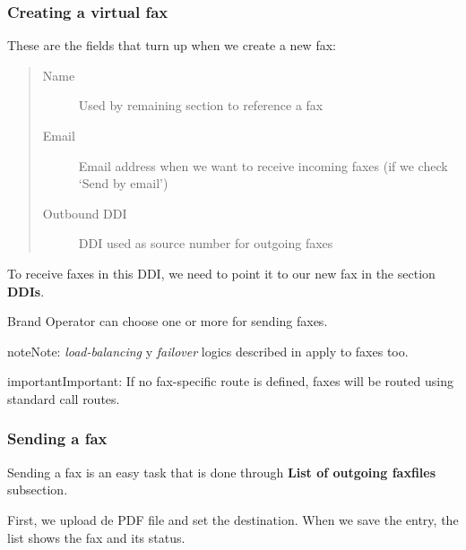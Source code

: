 \documentclass[letterpaper,10pt,english]{sphinxmanual}
\begin{document}
\subsubsection{Creating a virtual fax}
\label{administration_portal/client/vpbx/faxes:creating-a-virtual-fax}
These are the fields that turn up when we create a new fax:
\begin{quote}
\begin{description}
\item[{Name}] \leavevmode
Used by remaining section to reference a fax

\item[{Email}] \leavevmode
Email address when we want to receive incoming faxes (if we check `Send
by email')

\item[{Outbound DDI}] \leavevmode
DDI used as source number for outgoing faxes

\end{description}
\end{quote}

To receive faxes in this DDI, we need to point it to our new fax in the section
\textbf{DDIs}.

Brand Operator can choose one or more {\hyperref[administration_portal/brand/routing/outgoing_routings:outgoing\string-routings]{}} for sending faxes.

\begin{notice}{note}{Note:}
\emph{load-balancing} y \emph{failover} logics described in {\hyperref[administration_portal/brand/routing/outgoing_routings:outgoing\string-routings]{}}
apply to faxes too.
\end{notice}

\begin{notice}{important}{Important:}
If no fax-specific route is defined, faxes will be routed using
standard call routes.
\end{notice}


\subsubsection{Sending a fax}
\label{administration_portal/client/vpbx/faxes:sending-a-fax}
Sending a fax is an easy task that is done through \textbf{List of outgoing faxfiles} subsection.

First, we upload de PDF file and set the destination. When we save the entry, the list shows the fax and its status.
\end{document}
